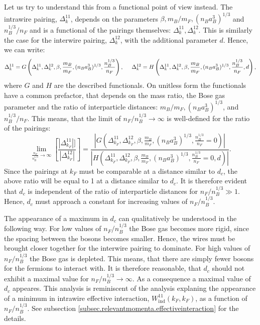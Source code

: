 Let us try to understand this from a functional point of view instead. The intrawire pairing, $\Delta^{11}_k$, depends on the parameters $\beta, m_B/m_F, (n_Ba_B^3)^{1/3}$ and $n_B^{1/3}/n_F$ and is a functional of the pairings themselves: $\Delta^{11}_k, \Delta^{12}_k$. This is similarly the case for the interwire pairing, $\Delta^{12}_k$, with the additional parameter $d$. Hence, we can write:
\begin{equation}
\Delta^{11}_k = G\left(\Delta^{11}_k, \Delta^{12}_k, \beta, \frac{m_B}{m_F}, (n_Ba_B^3)^{1/3}, \frac{n_B^{1/3}}{n_F} \right), \hspace{0.5cm} \Delta^{12}_k = H\left(\Delta^{11}_k, \Delta^{12}_k, \beta, \frac{m_B}{m_F}, (n_Ba_B^3)^{1/3}, \frac{n_B^{1/3}}{n_F}, d \right), \nonumber 
\end{equation}
where $G$ and $H$ are the described functionals. On unitless form the functionals have a common prefactor, that depends on the mass ratio, the Bose gas parameter and the ratio of interparticle distances: $m_B/m_F, (n_Ba_B^3)^{1/3}$, and $n_B^{1/3}/n_F$. This means, that the limit of $n_F/n_B^{1/3} \to \infty $ is well-defined for the ratio of the pairings:
\begin{equation}
\lim_{\frac{n_F}{n_B^{1/3}} \to \infty} \left[\frac{|\Delta^{11}_{k_F}|]}{|\Delta^{12}_{k_F}|}\right] = \frac{\left|G\left(\Delta^{11}_{k_F}, \Delta^{12}_{k_F}, \beta, \frac{m_B}{m_F}, (n_Ba_B^3)^{1/3}, \frac{n_B^{1/3}}{n_F} = 0 \right)\right|}{\left|H\left(\Delta^{11}_{k_F}, \Delta^{12}_{k_F}, \beta, \frac{m_B}{m_F}, (n_Ba_B^3)^{1/3}, \frac{n_B^{1/3}}{n_F} = 0, d \right)\right|}. \nonumber
\end{equation}
Since the pairings at $k_F$ must be comparable at a distance similar to $d_c$, the above ratio will be equal to 1 at a distance similar to $d_c$. It is therefore evident that $d_c$ is independent of the ratio of interparticle distances for $n_F/n_B^{1/3} \gg 1$. Hence, $d_c$ must approach a constant for increasing values of $n_F/n_B^{1/3}$. 

The appearance of a maximum in $d_c$ can qualitatively be understood in the following way. For low values of $n_F/n_B^{1/3}$ the Bose gas becomes more rigid, since the spacing between the bosons becomes smaller. Hence, the wires must be brought closer together for the interwire pairing to dominate. For high values of $n_F/n_B^{1/3}$ the Bose gas is depleted. This means, that there are simply fewer bosons for the fermions to interact with. It is therefore reasonable, that $d_c$ should not exhibit a maximal value for $n_F/n_B^{1/3} \to \infty$. As a consequence a maximal value of $d_c$ appeares. This analysis is reminiscent of the analysis explaning the appearance of a minimum in intrawire effective interaction, $W_\text{ind}^{11}(k_F,k_F)$, as a function of $n_F/n_B^{1/3}$. See subsection \ref{subsec.relevantmomenta.effectiveinteraction} for the details.  

